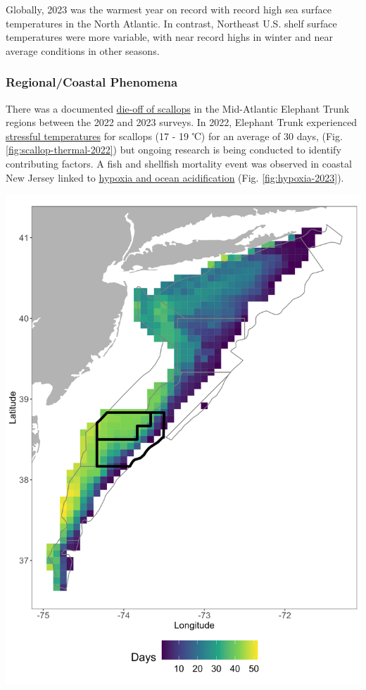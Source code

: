 \documentclass[
  10pt,
]{article}
\let\origfigure\figure
\let\endorigfigure\endfigure
\renewenvironment{figure}[1][2] {
    \expandafter\origfigure\expandafter[H]
} {
    \endorigfigure
}
\begin{document}
Globally, 2023 was the warmest year on record with record high sea surface temperatures in the North Atlantic. In contrast, Northeast U.S. shelf surface temperatures were more variable, with near record highs in winter and near average conditions in other seasons.

\hypertarget{regionalcoastal-phenomena}{%
\subsubsection{Regional/Coastal Phenomena}\label{regionalcoastal-phenomena}}

There was a documented \href{https://noaa-edab.github.io/catalog/observation-synthesis.html}{die-off of scallops} in the Mid-Atlantic Elephant Trunk regions between the 2022 and 2023 surveys. In 2022, Elephant Trunk experienced \href{https://noaa-edab.github.io/catalog/thermal-habitat-persistence.html}{stressful temperatures} for scallops (17 - 19 ℃) for an average of 30 days, (Fig. \ref{fig:scallop-thermal-2022}) but ongoing research is being conducted to identify contributing factors. A fish and shellfish mortality event was observed in coastal New Jersey linked to \href{https://noaa-edab.github.io/catalog/ocean-acidification-and-other-stressors.html}{hypoxia and ocean acidification} (Fig. \ref{fig:hypoxia-2023}).

\begin{figure}

{\centering \includegraphics[width=0.6\linewidth]{images/bottom_temp_threshold_17_19_Elephant_Trunk} 

}

\caption{The number of days in 2022 where bottom temperature was between 17 and 19 ℃  (sressful thermal temperatures for sea scallops)in each GLORYS grid cell. The gray lines show the sea scallop estimation areas, with the Elephant Trunk region highlighted in black lines.}\label{fig:scallop-thermal-2022}
\end{figure}
\end{document}
